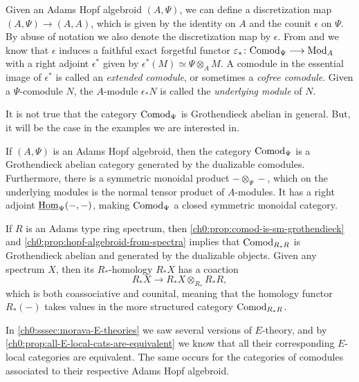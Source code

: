 \begin{construction}
    \label{ch0:const:discretization-adjunction}
    Given an Adams Hopf algebroid $(A, \Psi)$, we can define a discretization map $(A, \Psi)\longrightarrow (A, A)$, which is given by the identity on $A$ and the counit $\epsilon$ on $\Psi$. By abuse of notation we also denote the discretization map by $\epsilon$. From \cite[A1.2.1]{ravenel_86} and \cite[4.6]{barthel-heard-valenzuela_2018} we know that $\epsilon$ induces a faithful exact forgetful functor $\varepsilon_* \colon \mathrm{Comod}_\Psi \longrightarrow \mathrm{Mod}_A$ with a right adjoint $\epsilon^*$ given by $\epsilon^*(M)\simeq \Psi\otimes_A M$. A comodule in the essential image of $\epsilon^*$ is called an \emph{extended comodule}, or sometimes a \emph{cofree comodule}. Given a $\Psi$-comodule $N$, the $A$-module $\epsilon_* N$ is called the \emph{underlying module} of $N$.  
\end{construction}

It is not true that the category $\mathrm{Comod}_\Psi$ is Grothendieck abelian in general. But, it will be the case in the examples we are interested in. 

\begin{proposition}
    \label{ch0:prop:comod-is-sm-grothendieck}
    If $(A,\Psi)$ is an Adams Hopf algebroid, then the category $\mathrm{Comod}_\Psi$ is a Grothendieck abelian category generated by the dualizable comodules. Furthermore, there is a symmetric monoidal product $-\otimes_\Psi -$, which on the underlying modules is the normal tensor product of $A$-modules. It has a right adjoint $\operatorname{\underline{Hom}}_\Psi(-,-)$, making $\mathrm{Comod}_\Psi$ a closed symmetric monoidal category. 
\end{proposition}

\begin{example}
    If $R$ is an Adams type ring spectrum, then \cref{ch0:prop:comod-is-sm-grothendieck} and \cref{ch0:prop:hopf-algebroid-from-spectra} implies that $\mathrm{Comod}_{R_*R}$ is Grothendieck abelian and generated by the dualizable objects. Given any spectrum $X$, then its $R_*$-homology $R_*X$ has a coaction 
    \[R_*X \to R_*X \otimes_{R_*} R_*R,\]
    which is both coassociative and counital, meaning that the homology functor $R_*(-)$ takes values in the more structured category $\mathrm{Comod}_{R_*R}$. 
\end{example}

In \cref{ch0:sssec:morava-E-theories} we saw several versions of $E$-theory, and by \cref{ch0:prop:all-E-local-cats-are-equivalent} we know that all their corresponding $E$-local categories are equivalent. The same occurs for the categories of comodules associated to their respective Adams Hopf algebroid.

